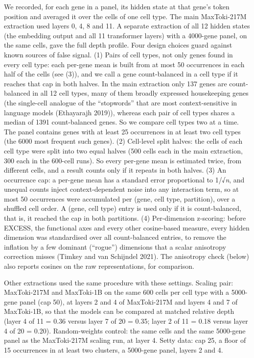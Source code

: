 \documentclass[
  11pt,
]{article}
\begin{document}
We recorded, for each gene in a panel, its hidden state at that gene's
token position and averaged it over the cells of one cell type. The main
MaxToki-217M extraction used layers 0, 4, 8 and 11. A separate
extraction of all 12 hidden states (the embedding output and all 11
transformer layers) with a 4000-gene panel, on the same cells, gave the
full depth profile. Four design choices guard against known sources of
false signal. (1) Pairs of cell types, not only genes found in every
cell type: each per-gene mean is built from at most 50 occurrences in
each half of the cells (see (3)), and we call a gene count-balanced in a
cell type if it reaches that cap in both halves. In the main extraction
only 137 genes are count-balanced in all 12 cell types, many of them
broadly expressed housekeeping genes (the single-cell analogue of the
``stopwords'' that are most context-sensitive in language models
(Ethayarajh 2019)), whereas each pair of cell types shares a median of
1391 count-balanced genes. So we compare cell types two at a time. The
panel contains genes with at least 25 occurrences in at least two cell
types (the 6000 most frequent such genes). (2) Cell-level split halves:
the cells of each cell type were split into two equal halves (500 cells
each in the main extraction, 300 each in the 600-cell runs). So every
per-gene mean is estimated twice, from different cells, and a result
counts only if it repeats in both halves. (3) An occurrence cap: a
per-gene mean has a standard error proportional to 1/√\emph{n}, and
unequal counts inject context-dependent noise into any interaction term,
so at most 50 occurrences were accumulated per (gene, cell type,
partition), over a shuffled cell order. A (gene, cell type) entry is
used only if it is count-balanced, that is, it reached the cap in both
partitions. (4) Per-dimension z-scoring: before EXCESS, the functional
axes and every other cosine-based measure, every hidden dimension was
standardised over all count-balanced entries, to remove the inflation by
a few dominant (``rogue'') dimensions that a scalar anisotropy
correction misses ({Timkey and van Schijndel} 2021). The anisotropy
check (below) also reports cosines on the raw representations, for
comparison.

Other extractions used the same procedure with these settings. Scaling
pair: MaxToki-217M and MaxToki-1B on the same 600 cells per cell type
with a 5000-gene panel (cap 50), at layers 2 and 4 of MaxToki-217M and
layers 4 and 7 of MaxToki-1B, so that the models can be compared at
matched relative depth (layer 4 of 11 = 0.36 versus layer 7 of 20 =
0.35; layer 2 of 11 = 0.18 versus layer 4 of 20 = 0.20). Random-weights
control: the same cells and the same 5000-gene panel as the MaxToki-217M
scaling run, at layer 4. Setty data: cap 25, a floor of 15 occurrences
in at least two clusters, a 5000-gene panel, layers 2 and 4.
\end{document}
